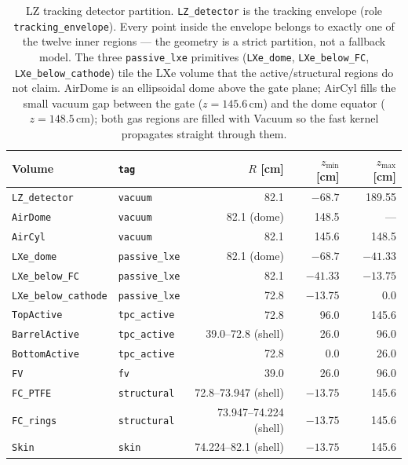 \documentclass[11pt]{article}
\begin{document}
\begin{table}[h]
\centering
\begin{tabular}{llrrr}
\toprule
Volume & \texttt{tag} & $R$ [cm] & $z_{\min}$ [cm] & $z_{\max}$ [cm] \\
\midrule
\texttt{LZ\_detector}      & \texttt{vacuum}      & 82.1                  & $-68.7$  & 189.55 \\
\texttt{AirDome}           & \texttt{vacuum}      & 82.1 (dome)           & 148.5    & ---    \\
\texttt{AirCyl}            & \texttt{vacuum}      & 82.1                  & 145.6    & 148.5  \\
\texttt{LXe\_dome}         & \texttt{passive\_lxe}& 82.1 (dome)           & $-68.7$  & $-41.33$ \\
\texttt{LXe\_below\_FC}    & \texttt{passive\_lxe}& 82.1                  & $-41.33$ & $-13.75$ \\
\texttt{LXe\_below\_cathode}& \texttt{passive\_lxe}& 72.8                 & $-13.75$ & 0.0    \\
\texttt{TopActive}         & \texttt{tpc\_active} & 72.8                  & 96.0     & 145.6  \\
\texttt{BarrelActive}      & \texttt{tpc\_active} & 39.0--72.8 (shell)    & 26.0     & 96.0   \\
\texttt{BottomActive}      & \texttt{tpc\_active} & 72.8                  & 0.0      & 26.0   \\
\texttt{FV}                & \texttt{fv}          & 39.0                  & 26.0     & 96.0   \\
\texttt{FC\_PTFE}          & \texttt{structural}  & 72.8--73.947 (shell)  & $-13.75$ & 145.6  \\
\texttt{FC\_rings}         & \texttt{structural}  & 73.947--74.224 (shell)& $-13.75$ & 145.6  \\
\texttt{Skin}              & \texttt{skin}        & 74.224--82.1 (shell)  & $-13.75$ & 145.6  \\
\bottomrule
\end{tabular}
\caption{LZ tracking detector partition. \texttt{LZ\_detector} is the
tracking envelope (role \texttt{tracking\_envelope}). Every point inside
the envelope belongs to exactly one of the twelve inner regions --- the
geometry is a strict partition, not a fallback model. The three
\texttt{passive\_lxe} primitives (\texttt{LXe\_dome},
\texttt{LXe\_below\_FC}, \texttt{LXe\_below\_cathode}) tile the LXe
volume that the active/structural regions do not claim. AirDome is an
ellipsoidal dome above the gate plane; AirCyl fills the small vacuum
gap between the gate ($z = 145.6$\,cm) and the dome equator
($z = 148.5$\,cm); both gas regions are filled with Vacuum so the
fast kernel propagates straight through them.}
\label{tab:tracking-regions}
\end{table}
\end{document}

